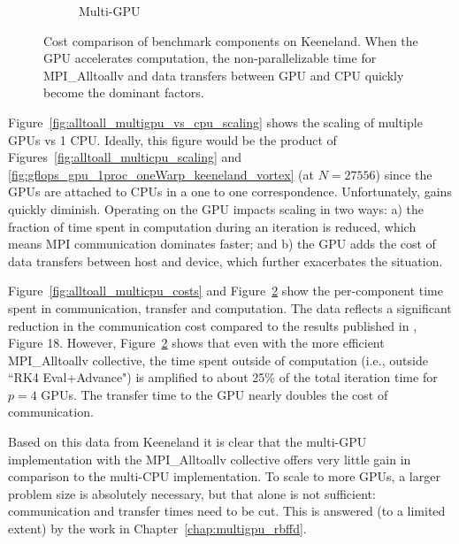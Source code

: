 \begin{figure}
\begin{subfigure}[t]{0.425\textwidth}
\caption{Multi-GPU}
\label{fig:alltoall_multigpu_costs}
\end{subfigure} 
\caption{Cost comparison of benchmark components on Keeneland. When the GPU accelerates computation, the non-parallelizable time for MPI\_Alltoallv and data transfers between GPU and CPU quickly become the dominant factors.}
\end{figure} 


Figure~\ref{fig:alltoall_multigpu_vs_cpu_scaling}  shows the scaling of multiple GPUs vs 1 CPU. Ideally, this figure would be the product of Figures~\ref{fig:alltoall_multicpu_scaling} and \ref{fig:gflops_gpu_1proc_oneWarp_keeneland_vortex} (at $N=27556$) since the GPUs are attached to CPUs in a one to one correspondence. Unfortunately, gains quickly diminish. Operating on the GPU impacts scaling in two ways: a) the fraction of time spent in computation during an iteration is reduced, which means MPI communication dominates faster; and b) the GPU adds the cost of data transfers between host and device, which further exacerbates the situation. 


Figure~\ref{fig:alltoall_multicpu_costs} and Figure~\ref{fig:alltoall_multigpu_costs} show the per-component time spent in communication, transfer and computation. The data reflects a significant reduction in the communication cost compared to the results published in \cite{BolligFlyerErlebacher2012}, Figure 18. However, Figure~\ref{fig:alltoall_multigpu_costs} shows that even with the more efficient MPI\_Alltoallv collective, the time spent outside of computation (i.e., outside ``RK4 Eval+Advance") is amplified to about 25\% of the total iteration time for $p=4$ GPUs. The transfer time to the GPU nearly doubles the cost of communication. 

Based on this data from Keeneland it is clear that the multi-GPU implementation with the MPI\_Alltoallv collective offers very little gain in comparison to the multi-CPU implementation. To scale to more GPUs, a larger problem size is absolutely necessary, but that alone is not sufficient: communication and transfer times need to be cut. This is answered (to a limited extent) by the work in Chapter~\ref{chap:multigpu_rbffd}.


%    

